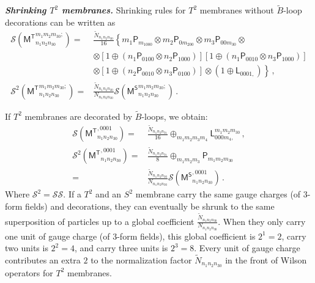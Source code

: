 \documentclass[11pt,nofootinbib,preprint]{revtex4-1}
\begin{document}
\textbf{\textit{Shrinking $T^2$ membranes.}}
Shrinking rules for $T^2$ membranes without $\tilde{B}$-loop decorations can be written as 
\begin{align}
	\mathcal{S} \left( {\mathsf{M}^{\mathsf{T}}}_{n_1n_2n_30}^{m_1m_2m_30;} \right) =&\frac{\tilde{N}_{n_1n_2n_30}}{16}\left\{ m_1\mathsf{P}_{m_1000}\otimes m_2\mathsf{P}_{0m_200}\otimes m_3\mathsf{P}_{00m_30}\otimes \right. \nonumber
	\\
	&\otimes \left[ 1\oplus \left( n_1\mathsf{P}_{0100}\otimes n_2\mathsf{P}_{1000} \right) \right] \left[ 1\oplus \left( n_1\mathsf{P}_{0010}\otimes n_3\mathsf{P}_{1000} \right) \right] \nonumber
	\\
	&\left. \otimes \left[ 1\oplus \left( n_2\mathsf{P}_{0010}\otimes n_3\mathsf{P}_{0100} \right) \right] \otimes \left( 1\oplus \mathsf{L}_{0001,} \right) \right\} \,,
	\\
	\mathcal{S} ^2\left( {\mathsf{M}^{\mathsf{T}}}_{n_1n_2n_30}^{m_1m_2m_30;} \right) =&\frac{\tilde{N}_{n_1n_2n_30}}{N_{n_1n_2n_30}}\mathcal{S} \left( {\mathsf{M}^{\mathsf{S}}}_{n_1n_2n_30}^{m_1m_2m_30;} \right) \,.
\end{align} 

If $T^2$ membranes are decorated by $\tilde{B}$-loops, we obtain:
\begin{align}
	\mathcal{S}\left( {\mathsf{M}^{\mathsf{T}}}_{n_1n_2n_30}^{,0001} \right) =&\frac{\tilde{N}_{n_1n_2n_31}}{16}\oplus _{m_1m_2m_3m_4}\mathsf{L}_{000m_4,}^{m_1m_2m_30} \,,
	\\
	\mathcal{S} ^2\left( {\mathsf{M}^{\mathsf{T}}}_{n_1n_2n_30}^{,0001} \right) =&\frac{\tilde{N}_{n_1n_2n_31}}{8}\oplus _{m_1m_2m_3}\mathsf{P}_{m_1m_2m_30}\nonumber
	\\
	=&\frac{\tilde{N}_{n_1n_2n_30}}{N_{n_1n_2n_30}}\mathcal{S} \left( {\mathsf{M}^{\mathsf{S}}}_{n_1n_2n_30}^{,0001} \right) \,.
\end{align}
Where $\mathcal{S}^2=\mathcal{S} \mathcal{S}$. If a $T^2$ and an $S^2$ membrane carry the same gauge charges (of 3-form fields) and decorations, they can eventually be shrunk to the same superposition of particles up to a global coefficient $\frac{\tilde{N}_{n_1n_2n_30}}{N_{n_1n_2n_30}}$. When they only carry one unit of gauge charge (of 3-form fields), this global coefficient is $2^1=2$, carry two units is $2^2=4$, and carry three units is $2^3=8$. Every unit of gauge charge contributes an extra $2$ to the normalization factor $\tilde{N}_{n_1n_2n_30}$ in the front of Wilson operators for $T^2$ membranes.
\end{document}
